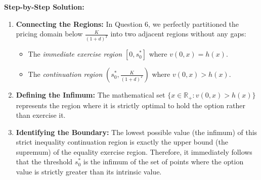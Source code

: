 \textbf{Step-by-Step Solution:}
\begin{enumerate}
    \item \textbf{Connecting the Regions:} In Question 6, we perfectly partitioned the pricing domain below $\frac{K}{(1+d)^T}$ into two adjacent regions without any gaps:
    \begin{itemize}
        \item The \textit{immediate exercise region} $[0, s_0^*]$ where $v(0,x) = h(x)$.
        \item The \textit{continuation region} $(s_0^*, \frac{K}{(1+d)^T})$ where $v(0,x) > h(x)$.
    \end{itemize}
    
    \item \textbf{Defining the Infimum:} The mathematical set $\{x \in \mathbb{R}_+ : v(0,x) > h(x)\}$ represents the region where it is strictly optimal to hold the option rather than exercise it.
    
    \item \textbf{Identifying the Boundary:} The lowest possible value (the infimum) of this strict inequality continuation region is exactly the upper bound (the supremum) of the equality exercise region. Therefore, it immediately follows that the threshold $s_0^*$ is the infimum of the set of points where the option value is strictly greater than its intrinsic value.
\end{enumerate}